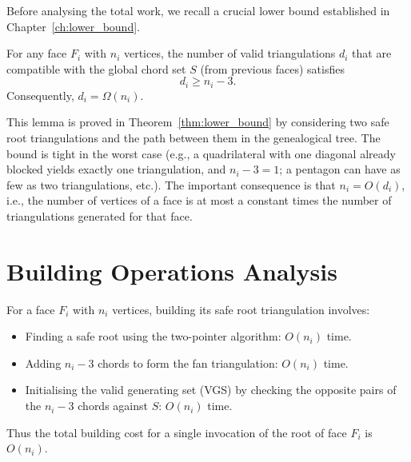 Before analysing the total work, we recall a crucial lower bound established in Chapter~\ref{ch:lower_bound}.

\begin{lemma}
    \label{lem:min_triangulations_final}
    For any face \(F_i\) with \(n_i\) vertices, the number of valid triangulations \(d_i\) that are compatible with the global chord set \(S\) (from previous faces) satisfies
    \[
        d_i \ge n_i - 3.
    \]
    Consequently, \(d_i = \Omega(n_i)\).
\end{lemma}

This lemma is proved in Theorem~\ref{thm:lower_bound} by considering two safe root triangulations and the path between them in the genealogical tree. 
The bound is tight in the worst case (e.g., a quadrilateral with one diagonal already blocked yields exactly one triangulation, and \(n_i-3 = 1\); a pentagon can have as few as two triangulations, etc.). 
The important consequence is that \(n_i = O(d_i)\), i.e., the number of vertices of a face is at most a constant times the number of triangulations generated for that face.

\section{Building Operations Analysis}
\label{sec:building_ops}

For a face \(F_i\) with \(n_i\) vertices, building its safe root triangulation involves:
\begin{itemize}
    \item Finding a safe root using the two-pointer algorithm: \(O(n_i)\) time.
    \item Adding \(n_i-3\) chords to form the fan triangulation: \(O(n_i)\) time.
    \item Initialising the valid generating set (VGS) by checking the opposite pairs of the \(n_i-3\) chords against \(S\): \(O(n_i)\) time.
\end{itemize}
Thus the total building cost for a single invocation of the root of face \(F_i\) is \(O(n_i)\).

